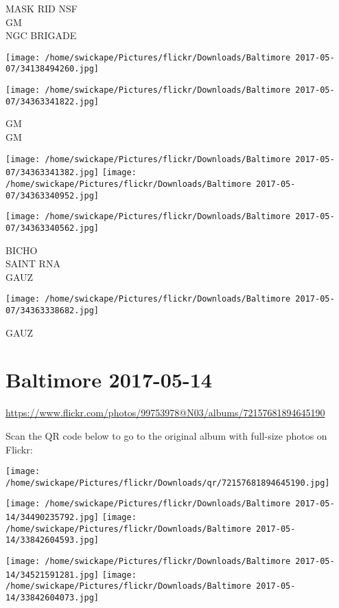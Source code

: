 \documentclass[10pt,letterpaper]{article}
\begin{document}
MASK RID NSF\\
GM\\
NGC BRIGADE
\pagebreak

\texttt{[image: /home/swickape/Pictures/flickr/Downloads/Baltimore 2017-05-07/34138494260.jpg]}

\vspace{0.25in}
\texttt{[image: /home/swickape/Pictures/flickr/Downloads/Baltimore 2017-05-07/34363341822.jpg]}

GM\\
GM
\pagebreak

\texttt{[image: /home/swickape/Pictures/flickr/Downloads/Baltimore 2017-05-07/34363341382.jpg]}
\texttt{[image: /home/swickape/Pictures/flickr/Downloads/Baltimore 2017-05-07/34363340952.jpg]}

\vspace{0.25in}
\texttt{[image: /home/swickape/Pictures/flickr/Downloads/Baltimore 2017-05-07/34363340562.jpg]}

BICHO\\
SAINT RNA\\
GAUZ
\pagebreak

\texttt{[image: /home/swickape/Pictures/flickr/Downloads/Baltimore 2017-05-07/34363338682.jpg]}

GAUZ
\pagebreak

\section*{Baltimore 2017-05-14}

\url{https://www.flickr.com/photos/99753978@N03/albums/72157681894645190}

Scan the QR code below to go to the original album with full-size photos on Flickr:

\texttt{[image: /home/swickape/Pictures/flickr/Downloads/qr/72157681894645190.jpg]}
\pagebreak

\texttt{[image: /home/swickape/Pictures/flickr/Downloads/Baltimore 2017-05-14/34490235792.jpg]}
\texttt{[image: /home/swickape/Pictures/flickr/Downloads/Baltimore 2017-05-14/33842604593.jpg]}

\texttt{[image: /home/swickape/Pictures/flickr/Downloads/Baltimore 2017-05-14/34521591281.jpg]}
\texttt{[image: /home/swickape/Pictures/flickr/Downloads/Baltimore 2017-05-14/33842604073.jpg]}
\end{document}
